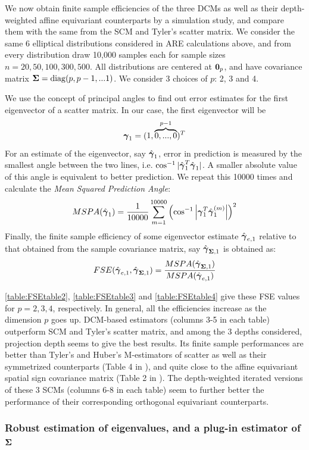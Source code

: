 We now obtain finite sample efficiencies of the three DCMs as well as their depth-weighted affine equivariant counterparts by a simulation study, and compare them with the same from the SCM and Tyler's scatter matrix. We consider the same 6 elliptical distributions considered in ARE calculations above, and from every distribution draw 10,000 samples each for sample sizes $n = 20, 50, 100, 300, 500$. All distributions are centered at ${\bf 0}_p$, and have covariance matrix ${\boldsymbol{\Sigma}} = \operatorname*{diag}(p,p-1,...1)$. We consider 3 choices of $p$: 2, 3 and 4.

We use the concept of principal angles \citep{miao92} to find out error estimates for the first eigenvector of a scatter matrix. In our case, the first eigenvector will be
%
$$ {\boldsymbol{\gamma}}_1 = (1,\overbrace{0,...,0}^{p-1})^T $$
%
For an estimate of the eigenvector, say $\hat{{\boldsymbol{\gamma}}}_1$, error in prediction is measured by the smallest angle between the two lines, i.e. $ \cos^{-1} | \hat{{\boldsymbol{\gamma}}}_1^T \hat{{\boldsymbol{\gamma}}}_1 | $. A smaller absolute value of this angle is equivalent to better prediction. We repeat this 10000 times and calculate the \textit{Mean Squared Prediction Angle}:
%
$$ MSPA(\hat {{\boldsymbol{\gamma}}}_1) = \frac{1}{10000} \sum_{m=1}^{10000} \left( \cos^{-1} \left|{\boldsymbol{\gamma}}_1^T \hat{{\boldsymbol{\gamma}}}^{(m)}_1 \right| \right)^2 $$
%
Finally, the finite sample efficiency of some eigenvector estimate $\hat{{\boldsymbol{\gamma}}}_{e,1}$ relative to that obtained from the sample covariance matrix, say $\hat{{\boldsymbol{\gamma}}}_{{\boldsymbol{\Sigma}},1}$ is obtained as:
%
$$
FSE(\hat{{\boldsymbol{\gamma}}}_{e,1}, \hat{{\boldsymbol{\gamma}}}_{{\boldsymbol{\Sigma}},1} ) = \frac{MSPA(\hat{{\boldsymbol{\gamma}}}_{{\boldsymbol{\Sigma}},1})}{MSPA(\hat{{\boldsymbol{\gamma}}}_{e,1})}
$$

\ref{table:FSEtable2}, \ref{table:FSEtable3} and \ref{table:FSEtable4} give these FSE values for $p=2,3,4$, respectively. In general, all the efficiencies increase as the dimension $p$ goes up. DCM-based estimators (columns 3-5 in each table) outperform SCM and Tyler's scatter matrix, and among the 3 depths considered, projection depth seems to give the best results. Its finite sample performances are better than Tyler's and Huber's M-estimators of scatter as well as their symmetrized counterparts (Table 4 in \cite{sirkia07}), and quite close to the affine equivariant spatial sign covariance matrix (Table 2 in \cite{ollilia03}). The depth-weighted iterated versions of these 3 SCMs (columns 6-8 in each table) seem to further better the performance of their corresponding orthogonal equivariant counterparts.

\subsubsection{Robust estimation of eigenvalues, and a plug-in estimator of ${\boldsymbol{\Sigma}}$}

